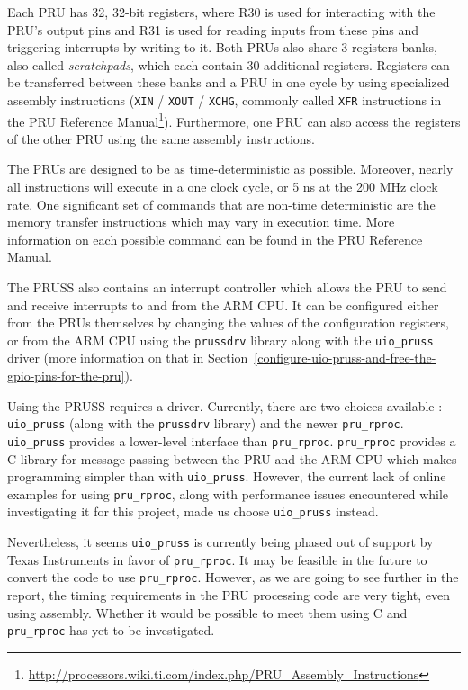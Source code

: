 \documentclass[]{report}
\begin{document}
Each PRU has 32, 32-bit registers, where R30 is used for interacting with the PRU's output pins and R31 is used for reading inputs from these pins and triggering interrupts by writing to it. Both PRUs also share 3 registers banks, also called \emph{scratchpads}, which each contain 30 additional registers. Registers can be transferred between these banks and a PRU in one cycle by using specialized assembly instructions (\texttt{XIN} / \texttt{XOUT} / \texttt{XCHG}, commonly called \texttt{XFR} instructions in the PRU Reference Manual\footnote{\url{http://processors.wiki.ti.com/index.php/PRU_Assembly_Instructions}}). Furthermore, one PRU can also access the registers of the other PRU using the same assembly instructions.

The PRUs are designed to be as time-deterministic as possible. Moreover, nearly all instructions will execute in a one clock cycle, or 5 ns at the 200 MHz clock rate. One significant set of commands that are non-time deterministic are the memory transfer instructions which may vary in execution time. More information on each possible command can be found in the PRU Reference Manual.

The PRUSS also contains an interrupt controller which allows the PRU to send and receive interrupts to and from the ARM CPU. It can be configured either from the PRUs themselves by changing the values of the configuration registers, or from the ARM CPU using the \texttt{prussdrv} library along with the \texttt{uio\_pruss} driver (more information on that in Section~\ref{configure-uio-pruss-and-free-the-gpio-pins-for-the-pru}).

Using the PRUSS requires a driver. Currently, there are two choices available : \texttt{uio\_pruss} (along with the \texttt{prussdrv} library) and the newer \texttt{pru\_rproc}. \texttt{uio\_pruss} provides a lower-level interface than \texttt{pru\_rproc}. \texttt{pru\_rproc} provides a C library for message passing between the PRU and the ARM CPU which makes programming simpler than with \texttt{uio\_pruss}. However, the current lack of online examples for using \texttt{pru\_rproc}, along with performance issues encountered while investigating it for this project, made us choose \texttt{uio\_pruss} instead.

Nevertheless, it seems \texttt{uio\_pruss} is currently being phased out of support by Texas Instruments in favor of \texttt{pru\_rproc}. It may be feasible in the future to convert the code to use \texttt{pru\_rproc}. However, as we are going to see further in the report, the timing requirements in the PRU processing code are very tight, even using assembly. Whether it would be possible to meet them using C and \texttt{pru\_rproc} has yet to be investigated.
\end{document}
